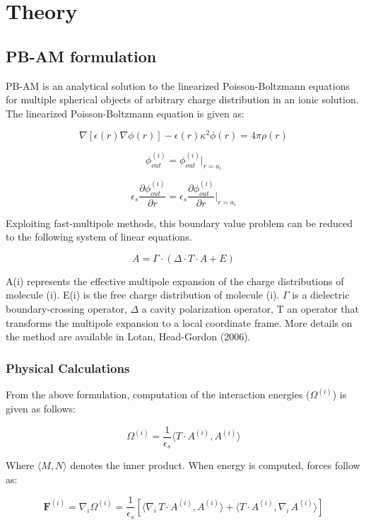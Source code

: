 
\chapter{Theory}



\section{PB-AM formulation}

PB-AM is an analytical solution to the linearized Poisson-Boltzmann equations for multiple spherical objects of arbitrary charge distribution in an ionic solution.  The linearized Poisson-Boltzmann equation is given as:

\[ \nabla [\epsilon(r) \nabla\phi(r)] - \epsilon(r) \kappa^2\phi(r) = 4 \pi \rho(r) \] %

\[ \phi_{out}^{(i)}= \phi_{out}^{(i)} \biggr |_{r=a_i } \]

\[\epsilon_s \frac{\partial \phi_{out}^{(i)}}{\partial r} =   \epsilon_s \frac{\partial \phi_{out}^{(i)}}{\partial r} \biggr |_{r=a_i } \]

Exploiting fast-multipole methods, this boundary value problem can be reduced to the following system of linear equations.  

\[ A = \Gamma \cdot (\Delta \cdot T \cdot A + E) \]

A(i) represents the effective multipole expansion of the charge distributions of molecule (i). E(i) is the free charge distribution of molecule (i). $\Gamma$ is a dielectric boundary-crossing operator, $\Delta$ a cavity polarization operator, T an operator that transforms the multipole expansion to a local coordinate frame.  More details on the method are available in Lotan, Head-Gordon (2006). \\

\subsection{Physical Calculations}

From the above formulation, computation of the interaction energies ($\Omega^{(i)}$) is given as follows:

\[\Omega^{(i)}=\frac{1}{\epsilon_s}  \langle  T \cdot A^{(i) } ,  A^{(i) } \rangle \]

Where $\langle  M, N \rangle$ denotes the inner product. When energy is computed, forces follow as:

\[ \textbf{F}^{(i)} = \nabla_i \Omega^{(i)}=\frac{1}{\epsilon_s} [ \langle \nabla_i \,T \cdot A^{(i) } ,  A^{(i) } \rangle +  \langle T \cdot A^{(i) } ,   \nabla_i \, A^{(i) } \rangle ]\]


